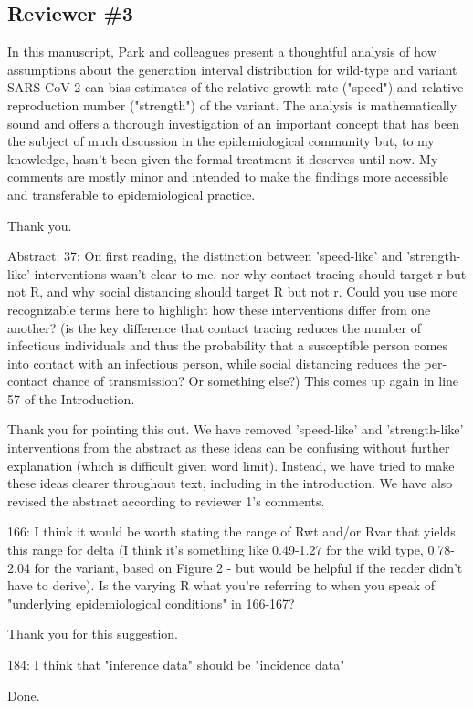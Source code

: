 \documentclass[12pt]{article}
\newcommand{\rev}{\subsection*}
\newcommand{\revtext}{\textsf}
\begin{document}
\rev{Reviewer \#3}

\revtext{In this manuscript, Park and colleagues present a thoughtful analysis of how assumptions about the generation interval distribution for wild-type and variant SARS-CoV-2 can bias estimates of the relative growth rate ("speed") and relative reproduction number ("strength") of the variant. The analysis is mathematically sound and offers a thorough investigation of an important concept that has been the subject of much discussion in the epidemiological community but, to my knowledge, hasn't been given the formal treatment it deserves until now. My comments are mostly minor and intended to make the findings more accessible and transferable to epidemiological practice.}

Thank you.

\revtext{Abstract: 37: On first reading, the distinction between 'speed-like' and 'strength-like' interventions wasn't clear to me, nor why contact tracing should target r but not R, and why social distancing should target R but not r. Could you use more recognizable terms here to highlight how these interventions differ from one another? (is the key difference that contact tracing reduces the number of infectious individuals and thus the probability that a susceptible person comes into contact with an infectious person, while social distancing reduces the per-contact chance of transmission? Or something else?) This comes up again in line 57 of the Introduction.}

Thank you for pointing this out. We have removed 'speed-like' and 'strength-like' interventions from the abstract as these ideas can be confusing without further explanation (which is difficult given word limit). Instead, we have tried to make these ideas clearer throughout text, including in the introduction. We have also revised the abstract according to reviewer 1's comments.

\revtext{166: I think it would be worth stating the range of Rwt and/or Rvar that yields this range for delta (I think it's something like 0.49-1.27 for the wild type, 0.78-2.04 for the variant, based on Figure 2 - but would be helpful if the reader didn't have to derive). Is the varying R what you're referring to when you speak of "underlying epidemiological conditions" in 166-167?}

Thank you for this suggestion.

\revtext{184: I think that "inference data" should be "incidence data"}

Done.
\end{document}
